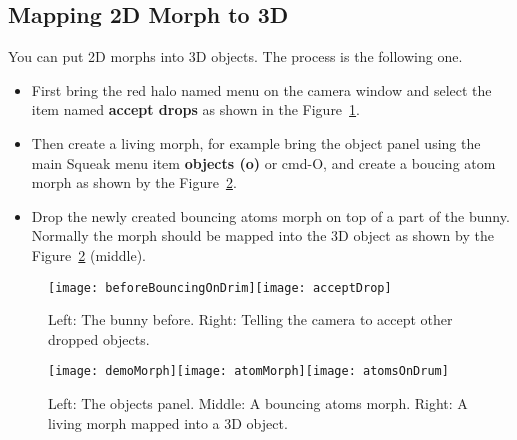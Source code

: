 \subsection*{Mapping 2D Morph to 3D}
You can put 2D morphs into 3D objects. The process is the following one.
\begin{itemize}
\item First bring the red halo named menu on the camera window and select the 
item named \textbf{accept drops} as shown in the Figure~\ref{fig:acceptDrop}.
\item Then create a living morph, for example bring the object panel using the main Squeak menu item \textbf{objects (o)} or cmd-O, and create a boucing atom morph
as shown by the Figure~\ref{fig:bouncingMorph}.
\item Drop the newly created bouncing atoms morph 
on top of a part of the bunny. Normally the morph should be mapped into the 3D object as shown by the Figure~\ref{fig:bouncingMorph} (middle).
\end{itemize}

\begin{figure}[h]
\begin{center}\texttt{[image: beforeBouncingOnDrim]}\hspace{0.5cm}\texttt{[image: acceptDrop]}\end{center}\caption{Left: The bunny before. Right: Telling the camera to accept other dropped objects.\label{fig:acceptDrop}}
\end{figure}


\begin{figure}[h]
\begin{center}\texttt{[image: demoMorph]}\hspace{0.2cm}\texttt{[image: atomMorph]}\hspace{0.2cm}\texttt{[image: atomsOnDrum]}\caption{Left: The objects panel. Middle: A bouncing atoms morph. Right: A living morph mapped into a 3D object.\label{fig:bouncingMorph}} \end{center}
\end{figure}



